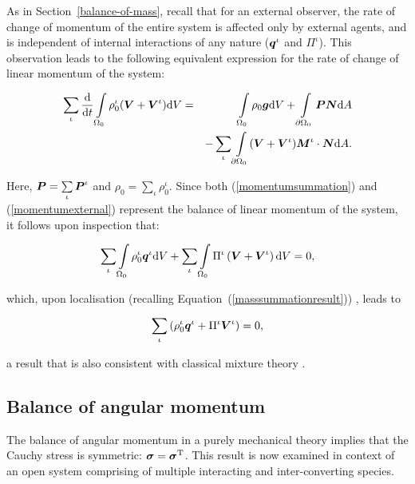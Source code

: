 As in Section~\ref{balance-of-mass}, recall that for an external
observer, the rate of change of momentum of the entire system is
affected only by external agents, and is independent of internal
interactions of any nature ($\mbox{\boldmath$ q$}^\iota$ and $\Pi^\iota$). This
observation leads to the following equivalent expression for the rate
of change of linear momentum of the system:

\begin{eqnarray}
\sum\limits_{\iota}\frac{\mathrm{d}}{\mathrm{d}t}
\int\limits_{\Omega_0} \rho_0^\iota(\mbox{\boldmath$ V$}+\mbox{\boldmath$ V$}^\iota) \mathrm{d}V &=&
\int\limits_{\Omega_0}\rho_0\mbox{\boldmath$ g$} \mathrm{d}V + \int\limits_{\partial
  \Omega_0}\mbox{\boldmath$ P$}\mbox{\boldmath$ N$} \mathrm{d}A \nonumber\\ & &-
\sum\limits_{\iota}\int\limits_{\partial
  \Omega_0}(\mbox{\boldmath$ V$}+\mbox{\boldmath$ V$}^\iota)\mbox{\boldmath$ M$}^\iota\cdot\mbox{\boldmath$ N$} \mathrm{d}A.
\label{momentumexternal}
\end{eqnarray}

\noindent Here, $\mbox{\boldmath$ P$} = \sum\limits_{\iota}\mbox{\boldmath$ P$}^\iota$ and $\rho_0 =
\sum\limits_{\iota}\rho_0^\iota$. Since both (\ref{momentumsummation})
and (\ref{momentumexternal}) represent the balance of linear momentum
of the system, it follows upon inspection that:

\begin{eqnarray}
\sum\limits_{\iota}\int\limits_{\Omega_0} \rho^\iota_0\mbox{\boldmath$ q$}^\iota
\mathrm{d}V + \sum\limits_{\iota}\int\limits_{\Omega_0} \Pi^\iota
\left(\mbox{\boldmath$ V$}+\mbox{\boldmath$ V$}^\iota\right) \mathrm{d}V = 0,\nonumber
\end{eqnarray}

\noindent which, upon localisation (recalling
Equation~(\ref{masssummationresult})) , leads to

\begin{eqnarray}
\sum\limits_{\iota}\left(\rho^\iota_0\mbox{\boldmath$ q$}^\iota +
\Pi^\iota\mbox{\boldmath$ V$}^\iota\right)=0,
\label{momentumsummationresult}
\end{eqnarray}

\noindent a result that is also consistent with classical mixture
theory \citep{TruesdellNoll:65}.

\subsection{Balance of angular momentum}
\label{balance-of-angular-momentum}

The balance of angular momentum in a purely mechanical theory implies
that the Cauchy stress is symmetric: $\mbox{\boldmath$\sigma$} =
\mbox{\boldmath$\sigma$}^{\mathrm{T}}$. This result is now examined in context of an
open system comprising of multiple interacting and inter-converting
species.

